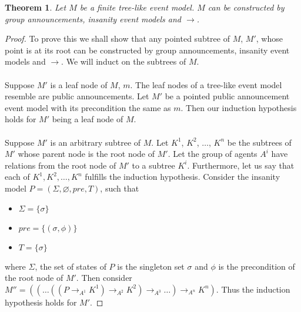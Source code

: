 \documentclass[12pt, a4paper, titlepage]{scrartcl}
\newtheorem{thm}{Theorem}
\begin{document}
\begin{thm}
Let $M$ be a finite tree-like event model.
$M$ can be constructed by group announcements, insanity event models and $\to$.
\end{thm}
\begin{proof}
To prove this we shall show that any pointed subtree of $M$, $M'$, whose point
is at its root can be constructed by group announcements, insanity event models
and $\to$.
We will induct on the subtrees of $M$.\\
\\
Suppose $M'$ is a leaf node of $M$, $m$.
The leaf nodes of a tree-like event model resemble are public announcements.
Let $M'$ be a pointed public announcement event model with its precondition the
same as $m$.
Then our induction hypothesis holds for $M'$ being a leaf node of $M$.\\
\\
Suppose $M'$ is an arbitrary subtree of $M$.
Let $K^1$, $K^2$, $\ldots$, $K^n$ be the subtrees of $M'$ whose parent node is
the root node of $M'$.
Let the group of agents $A^i$ have relations from the root node of $M'$ to a
subtree $K^i$.
Furthermore, let us say that each of $K^1, K^2, \ldots, K^n$ fulfills the
induction hypothesis.
Consider the insanity model $P = (\Sigma,\varnothing,pre,T)$, such that
\begin{itemize}
  \item $\Sigma = \{ \sigma \}$
  \item $pre = \{ (\sigma, \phi)\}$
  \item $T = \{\sigma\}$
\end{itemize}
where $\Sigma$, the set of states of $P$ is the singleton set $\sigma$ and 
$\phi$ is the precondition of the root node of $M'$.
Then consider $M'' = ((\ldots((P \to_{A^1} K^1) \to_{A^2} K^2) \to_{A^3} \ldots)\to_{A^n} K^n)$.
Thus the induction hypothesis holds for $M'$.
\end{proof}
\end{document}
